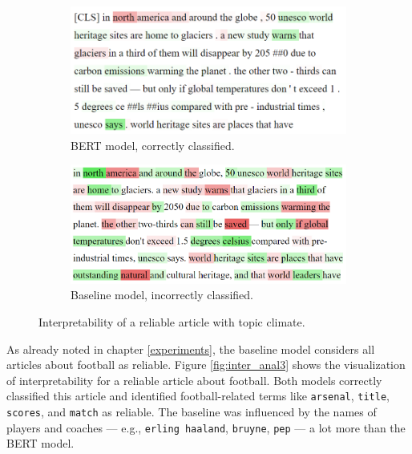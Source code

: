 \begin{figure}[H]
    \centering
    \begin{subfigure}{.5\textwidth}
      \centering
      \includegraphics[width=\linewidth]{obrazky-figures/unesco_bert.png}
      \caption{BERT model, correctly classified.}
      \label{fig:inter_anal2_a}
    \end{subfigure}%
    \begin{subfigure}{.5\textwidth}
      \centering
      \includegraphics[width=\linewidth]{obrazky-figures/bayes_unecso.png}
      \caption{Baseline model, incorrectly classified.}
      \label{fig:inter_anal2_b}
    \end{subfigure}
    \caption{Interpretability of a reliable article with topic climate.}
    \label{fig:inter_anal2}
\end{figure}

As already noted in chapter \ref{experiments}, the baseline model considers all articles about football as reliable. Figure \ref{fig:inter_anal3} shows the visualization of interpretability for a reliable article about football. Both models correctly classified this article and identified football-related terms like \texttt{arsenal}, \texttt{title}, \texttt{scores}, and \texttt{match} as reliable. The baseline was influenced by the names of players and coaches --- e.g., \texttt{erling haaland}, \texttt{bruyne}, \texttt{pep} --- a lot more than the BERT model.


